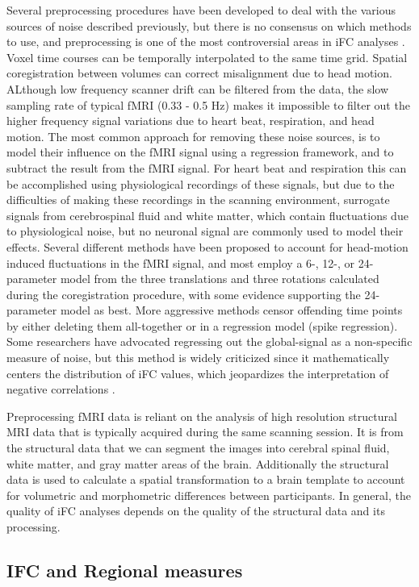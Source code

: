 Several preprocessing procedures have been developed to deal with the various sources of noise described previously, but there is no consensus on which methods to use, and preprocessing is one of the most controversial areas in iFC analyses \cite{}. Voxel time courses can be temporally interpolated to the same time grid. Spatial coregistration between volumes can correct misalignment due to head motion. ALthough low frequency scanner drift can be filtered from the data, the slow sampling rate of typical fMRI (0.33 - 0.5 Hz) makes it impossible to filter out the higher frequency signal variations due to heart beat, respiration, and head motion. The most common approach for removing these noise sources, is to model their influence on the fMRI signal using a regression framework, and to subtract the result from the fMRI signal. For heart beat and respiration this can be accomplished using physiological recordings of these signals, but due to the difficulties of making these recordings in the scanning environment, surrogate signals from cerebrospinal fluid and white matter, which contain fluctuations due to physiological noise, but no neuronal signal are commonly used to model their effects. Several different methods have been proposed to account for head-motion induced fluctuations in the fMRI signal, and most employ a 6-, 12-, or 24-parameter model from the three translations and three rotations calculated during the coregistration procedure, with some evidence supporting the 24-parameter model as best. More aggressive methods censor offending time points by either deleting them all-together or in a regression model (spike regression). Some researchers have advocated regressing out the global-signal as a non-specific measure of noise, but this method is widely criticized since it mathematically centers the distribution of iFC values, which jeopardizes the interpretation of negative correlations \cite{}.  

Preprocessing fMRI data is reliant on the analysis of high resolution structural MRI data that is typically acquired during the same scanning session. It is from the structural data that we can segment the images into cerebral spinal fluid, white matter, and gray matter areas of the brain. Additionally the structural data is used to calculate a spatial transformation to a brain template to account for volumetric and morphometric differences between participants. In general, the quality of iFC analyses depends on the quality of the structural data and its processing.

\subsection*{IFC and Regional measures}

